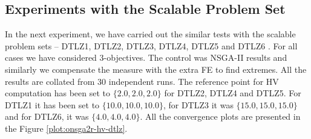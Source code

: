 \documentclass[journal]{IEEEtran}
\begin{document}
\subsection{Experiments with the Scalable Problem Set}
\label{sec:onsga2r-dtlz}
In the next experiment, we have carried out the similar tests with the scalable problem sets -- DTLZ1, DTLZ2, DTLZ3, DTLZ4, DTLZ5 and DTLZ6 \cite{dtlz-set}. For all cases we have considered \(3\)-objectives. The control was NSGA-II results and similarly we compensate the measure with the extra FE to find extremes. All the results are collated from 30 independent runs. The reference point for HV computation has been set to \(\{2.0, 2.0, 2.0\}\) for DTLZ2, DTLZ4 and DTLZ5. For DTLZ1 it has been set to \(\{10.0, 10.0, 10.0\}\), for DTLZ3 it was \(\{15.0, 15.0, 15.0\}\) and for DTLZ6, it was \(\{4.0, 4.0, 4.0\}\). All the convergence plots are presented in the Figure \ref{plot:onsga2r-hv-dtlz}. 
\end{document}
